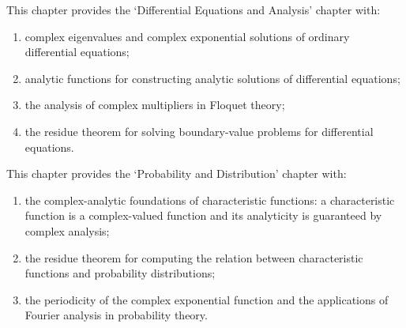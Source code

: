 \begin{remark}\label{rem:ca_to_diffeq}
This chapter provides the `Differential Equations and Analysis' chapter with:
\begin{enumerate}[label=(\roman*)]
    \item complex eigenvalues and complex exponential solutions of ordinary differential equations;
    \item analytic functions for constructing analytic solutions of differential equations;
    \item the analysis of complex multipliers in Floquet theory;
    \item the residue theorem for solving boundary-value problems for differential equations.
\end{enumerate}
\end{remark}

\begin{remark}\label{rem:ca_to_probability}
This chapter provides the `Probability and Distribution' chapter with:
\begin{enumerate}[label=(\roman*)]
    \item the complex-analytic foundations of characteristic functions: a characteristic function is a complex-valued function and its analyticity is guaranteed by complex analysis;
    \item the residue theorem for computing the relation between characteristic functions and probability distributions;
    \item the periodicity of the complex exponential function and the applications of Fourier analysis in probability theory.
\end{enumerate}
\end{remark}

